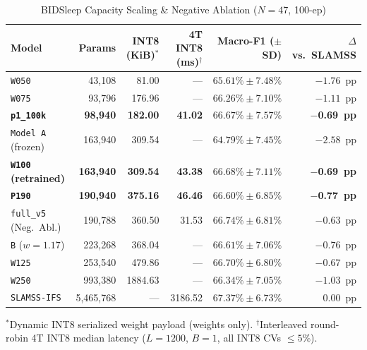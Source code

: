 \documentclass[journal]{IEEEtran}
\begin{document}
\begin{table}[!t]
\centering
\caption{BIDSleep Capacity Scaling \& Negative Ablation ($N=47$, 100-ep)}
\label{tab:scaling}
\scriptsize
\begin{tabular}{@{}lrrrrr@{}}
\toprule
Model & Params & INT8 (KiB)$^*$ & 4T INT8 (ms)$^\dagger$ & Macro-F1 ($\pm$ SD) & $\Delta$ vs.\ SLAMSS \\
\midrule
\texttt{W050} & 43,108 & 81.00 & --- & $65.61\% \pm 7.48\%$ & $-1.76$~pp \\
\texttt{W075} & 93,796 & 176.96 & --- & $66.26\% \pm 7.10\%$ & $-1.11$~pp \\
\textbf{\texttt{p1\_100k}} & \textbf{98,940} & \textbf{182.00} & \textbf{41.02} & \textbf{$66.67\% \pm 7.57\%$} & \textbf{$-$0.69~pp} \\
\texttt{Model A} (frozen) & 163,940 & 309.54 & --- & $64.79\% \pm 7.45\%$ & $-2.58$~pp \\
\textbf{\texttt{W100} (retrained)} & \textbf{163,940} & \textbf{309.54} & \textbf{43.38} & \textbf{$66.68\% \pm 7.11\%$} & \textbf{$-$0.69~pp} \\
\textbf{\texttt{P190}} & \textbf{190,940} & \textbf{375.16} & \textbf{46.46} & \textbf{$66.60\% \pm 6.85\%$} & \textbf{$-$0.77~pp} \\
\texttt{full\_v5} (Neg.\ Abl.) & 190,788 & 360.50 & 31.53 & $66.74\% \pm 6.81\%$ & $-0.63$~pp \\
\texttt{B} ($w=1.17$) & 223,268 & 368.04 & --- & $66.61\% \pm 7.06\%$ & $-0.76$~pp \\
\texttt{W125} & 253,540 & 479.86 & --- & $66.70\% \pm 6.80\%$ & $-0.67$~pp \\
\texttt{W250} & 993,380 & 1884.63 & --- & $66.34\% \pm 7.05\%$ & $-1.03$~pp \\
\texttt{SLAMSS-IFS} & 5,465,768 & --- & 3186.52 & $67.37\% \pm 6.73\%$ & 0.00~pp \\
\bottomrule
\end{tabular}
\par\vspace{0.2em}\raggedright\scriptsize $^*$Dynamic INT8 serialized weight payload (weights only). $^\dagger$Interleaved round-robin 4T INT8 median latency ($L=1200$, $B=1$, all INT8 CVs $\le 5\%$).
\end{table}
\end{document}
